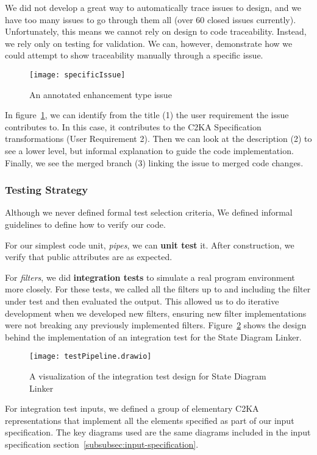 We did not develop a great way to automatically trace issues to design,
and we have too many issues to go through them all (over 60 closed issues currently).
Unfortunately, this means we cannot rely on design to code traceability.
Instead, we rely only on testing for validation.
We can, however, demonstrate how we could attempt to show traceability manually through a specific issue.
\begin{figure}[ht]
    \centering
    \texttt{[image: specificIssue]}
    \caption{An annotated enhancement type issue}
    \label{fig:specificIssue}
\end{figure}
In figure~\ref{fig:specificIssue}, we can identify from the title (1) the user requirement the issue contributes to.
In this case, it contributes to the C2KA Specification transformations (User Requirement 2).
Then we can look at the description (2) to see a lower level, but informal explanation to guide the code implementation.
Finally, we see the merged branch (3) linking the issue to merged code changes.

\newpage
\subsubsection{Testing Strategy}\label{subsubsec:tests-strat}
Although we never defined formal test selection criteria,
We defined informal guidelines to define how to verify our code.

For our simplest code unit, \textit{pipes}, we can \textbf{unit test} it.
After construction, we verify that public attributes are as expected.

For \textit{filters}, we did \textbf{integration tests} to simulate a real program environment more closely.
For these tests, we called all the filters up to and including the filter under test and then evaluated the output.
This allowed us to do iterative development when we developed new filters,
ensuring new filter implementations were not breaking any previously implemented filters.
Figure~\ref{fig:testShowcase} shows the design behind the implementation of an integration test for the State Diagram Linker.
\begin{figure}[ht]
    \centering
    \texttt{[image: testPipeline.drawio]}
    \caption{A visualization of the integration test design for State Diagram Linker}
    \label{fig:testShowcase}
\end{figure}

For integration test inputs, we defined a group of elementary C2KA representations that implement
all the elements specified as part of our input specification.
The key diagrams used are the same diagrams included in the input specification section~\ref{subsubsec:input-specification}.

